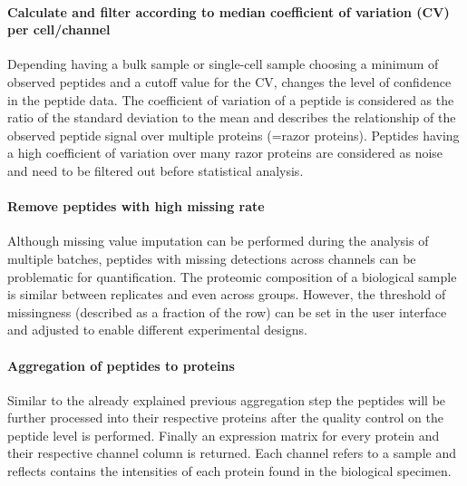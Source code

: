 \documentclass[
  11pt,
]{article}
\begin{document}
\hypertarget{calculate-and-filter-according-to-median-coefficient-of-variation-cv-per-cellchannel}{%
\paragraph{Calculate and filter according to median coefficient of
variation (CV) per
cell/channel}\label{calculate-and-filter-according-to-median-coefficient-of-variation-cv-per-cellchannel}}

Depending having a bulk sample or single-cell sample choosing a minimum
of observed peptides and a cutoff value for the CV, changes the level of
confidence in the peptide data. The coefficient of variation of a
peptide is considered as the ratio of the standard deviation to the mean
and describes the relationship of the observed peptide signal over
multiple proteins (=razor proteins). Peptides having a high coefficient
of variation over many razor proteins are considered as noise and need
to be filtered out before statistical analysis.

\hypertarget{remove-peptides-with-high-missing-rate}{%
\paragraph{Remove peptides with high missing
rate}\label{remove-peptides-with-high-missing-rate}}

Although missing value imputation can be performed during the analysis
of multiple batches, peptides with missing detections across channels
can be problematic for quantification. The proteomic composition of a
biological sample is similar between replicates and even across groups.
However, the threshold of missingness (described as a fraction of the
row) can be set in the user interface and adjusted to enable different
experimental designs.

\hypertarget{aggregation-of-peptides-to-proteins}{%
\paragraph{Aggregation of peptides to
proteins}\label{aggregation-of-peptides-to-proteins}}

Similar to the already explained previous aggregation step the peptides
will be further processed into their respective proteins after the
quality control on the peptide level is performed. Finally an expression
matrix for every protein and their respective channel column is
returned. Each channel refers to a sample and reflects contains the
intensities of each protein found in the biological specimen.
\end{document}

